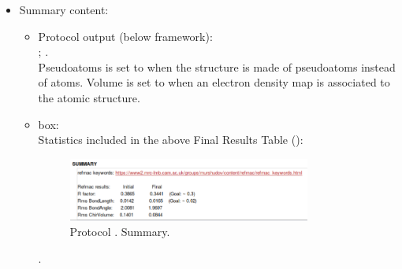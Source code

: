 \begin{itemize}
 \item Summary content:\\
  \begin{itemize}
     \item Protocol output (below \scipion framework):\\ ; .\\Pseudoatoms is set to  when the structure is made of pseudoatoms instead of atoms. Volume is set to  when an electron density map is associated to the atomic structure.\\
     \item {} box:\\Statistics included in the above Final Results Table ():
     \begin{figure}[H]
         \centering 
         \captionsetup{width=.7\linewidth} 
         \includegraphics[width=0.80\textwidth]{Images_appendix/Fig138.pdf}
         \caption{Protocol . Summary.}
         \label{fig:app_protocol_refmac_13}
        \end{figure}.\\
    \end{itemize}

  \end{itemize}

    
